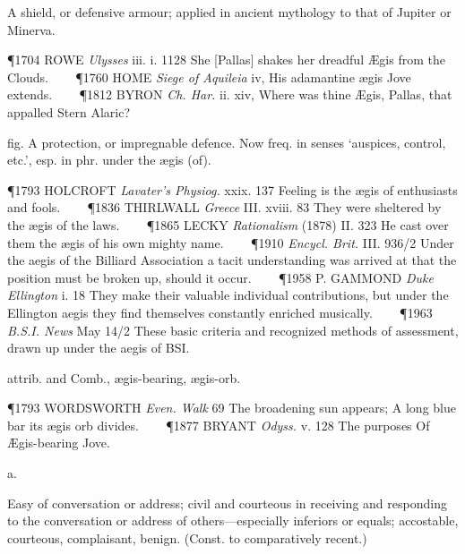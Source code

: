 \begin{description}[wide, labelwidth=!, labelindent=0pt]
\vspace{-0.3cm}

\begin{myenumerate}
 A shield, or defensive armour; applied in ancient mythology to that of Jupiter or Minerva. 

\P 1704 ROWE \textit{Ulysses} iii. i. 1128 She [Pallas] shakes her dreadful Ægis from the Clouds.    
\P 1760 HOME \textit{Siege of Aquileia} iv, His adamantine ægis Jove extends.    
\P 1812 BYRON \textit{Ch. Har.} ii. xiv, Where was thine Ægis, Pallas, that appalled Stern Alaric?

 fig. A protection, or impregnable defence. Now freq. in senses ‘auspices, control, etc.’, esp. in phr. under the ægis (of). 

\P 1793 HOLCROFT \textit{Lavater's Physiog.} xxix. 137 Feeling is the ægis of enthusiasts and fools.    
\P 1836 THIRLWALL \textit{Greece} III. xviii. 83 They were sheltered by the ægis of the laws.    
\P 1865 LECKY \textit{Rationalism} (1878) II. 323 He cast over them the ægis of his own mighty name.    
\P 1910 \textit{Encycl. Brit.} III. 936/2 Under the aegis of the Billiard Association a tacit understanding was arrived at that the position must be broken up, should it occur.    
\P 1958 P. GAMMOND \textit{Duke Ellington} i. 18 They make their valuable individual contributions, but under the Ellington aegis they find themselves constantly enriched musically.    
\P 1963 \textit{B.S.I. News} May 14/2 These basic criteria and recognized methods of assessment, drawn up under the aegis of BSI.

 attrib. and Comb., ægis-bearing, ægis-orb. 

\P 1793 WORDSWORTH \textit{Even. Walk} 69 The broadening sun appears; A long blue bar its ægis orb divides.    
\P 1877 BRYANT \textit{Odyss.} v. 128 The purposes Of Ægis-bearing Jove.
\end{myenumerate}

  a.

\noindent  {}

\vspace{-0.3cm}

\begin{myenumerate}
 Easy of conversation or address; civil and courteous in receiving and responding to the conversation or address of others—especially inferiors or equals; accostable, courteous, complaisant, benign. (Const. to comparatively recent.) 


\end{myenumerate}
\end{description}
